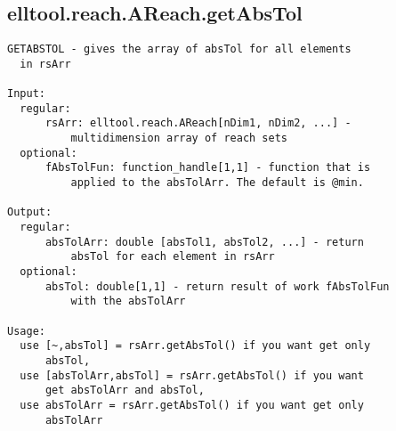 \subsection{\texorpdfstring{elltool.reach.AReach.getAbsTol}{getAbsTol}}\label{method:elltool.reach.AReach.getAbsTol}
\begin{verbatim}
GETABSTOL - gives the array of absTol for all elements
  in rsArr

Input:
  regular:
      rsArr: elltool.reach.AReach[nDim1, nDim2, ...] -
          multidimension array of reach sets
  optional:
      fAbsTolFun: function_handle[1,1] - function that is
          applied to the absTolArr. The default is @min.

Output:
  regular:
      absTolArr: double [absTol1, absTol2, ...] - return
          absTol for each element in rsArr
  optional:
      absTol: double[1,1] - return result of work fAbsTolFun
          with the absTolArr

Usage:
  use [~,absTol] = rsArr.getAbsTol() if you want get only
      absTol,
  use [absTolArr,absTol] = rsArr.getAbsTol() if you want
      get absTolArr and absTol,
  use absTolArr = rsArr.getAbsTol() if you want get only
      absTolArr
\end{verbatim}
